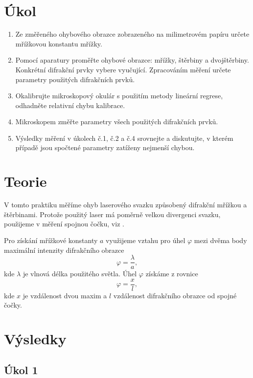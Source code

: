 \documentclass{protokol}
\begin{document}
  \section*{Úkol}

    \begin{enumerate}
      \item Ze změřeného ohybového obrazce zobrazeného na milimetrovém papíru určete mřížkovou konstantu mřížky.
      \item Pomocí aparatury proměřte ohybové obrazce: mřížky, štěrbiny a dvojštěrbiny. Konkrétní difrakční prvky vybere vyučující. Zpracováním měření určete parametry použitých difrakčních prvků.
      \item Okalibrujte mikroskopový okulár s použitím metody lineární regrese, odhadněte relativní chybu kalibrace.
      \item Mikroskopem změřte parametry všech použitých difrakčních prvků.
      \item Výsledky měření v úkolech č.1, č.2 a č.4 srovnejte a diskutujte, v kterém případě jsou spočtené parametry zatíženy nejmenší chybou. 
    \end{enumerate}

  \section*{Teorie}

    V tomto praktiku měříme ohyb laserového svazku způsobený difrakční mřížkou a štěrbinami. Protože použitý laser má poměrně velkou divergenci svazku, použijeme v měření spojnou čočku, viz \cite{mereni}. 

    Pro získání mřížkové konstanty $a$ využijeme vztahu pro úhel $\varphi$ mezi dvěma body maximální intenzity difrakčního obrazce
    \begin{equation}
      \varphi = \frac{\lambda}{a},
    \end{equation} 
    kde $\lambda$ je vlnová délka použitého světla. Úhel $\varphi$ získáme z rovnice
    \begin{equation}
      \varphi = \frac{x}{l},
    \end{equation}
    kde $x$ je vzdálenost dvou maxim a $l$ vzdálenost difrakčního obrazce od spojné čočky.

  \section*{Výsledky}

    \subsection*{Úkol 1}
\end{document}
